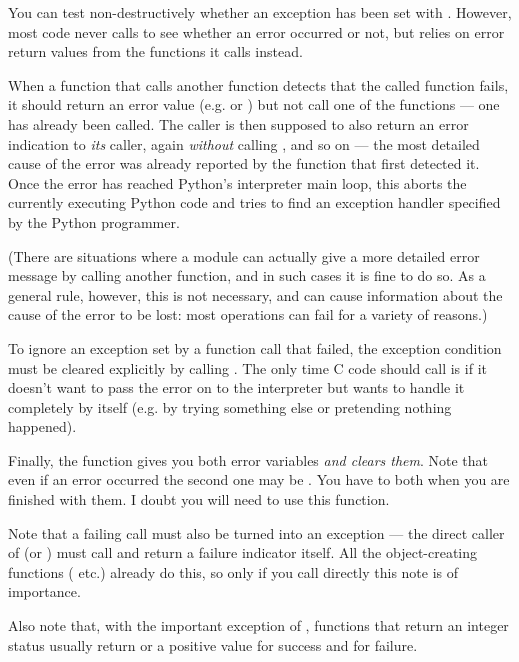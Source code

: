 You can test non-destructively whether an exception has been set with
.  However, most code never calls
 to see whether an error occurred or not, but
relies on error return values from the functions it calls instead.

When a function that calls another function detects that the called
function fails, it should return an error value (e.g.  or
) but not call one of the  functions --- one has
already been called.  The caller is then supposed to also return an
error indication to {\em its} caller, again {\em without} calling
, and so on --- the most detailed cause of the error was
already reported by the function that first detected it.  Once the
error has reached Python's interpreter main loop, this aborts the
currently executing Python code and tries to find an exception handler
specified by the Python programmer.

(There are situations where a module can actually give a more detailed
error message by calling another  function, and in such
cases it is fine to do so.  As a general rule, however, this is not
necessary, and can cause information about the cause of the error to
be lost: most operations can fail for a variety of reasons.)

To ignore an exception set by a function call that failed, the
exception condition must be cleared explicitly by calling
.  The only time C code should call
 is if it doesn't want to pass the error on to the
interpreter but wants to handle it completely by itself (e.g. by
trying something else or pretending nothing happened).

Finally, the function  gives you both error variables
{\em and clears them}.  Note that even if an error occurred the second
one may be .  You have to  both when you
are finished with them.  I doubt you will need to use this function.

Note that a failing  call must also be turned into an
exception --- the direct caller of  (or
) must call  and return a failure
indicator itself.  All the object-creating functions
( etc.) already do this, so only if you call
 directly this note is of importance.

Also note that, with the important exception of ,
functions that return an integer status usually return  or a
positive value for success and  for failure.

